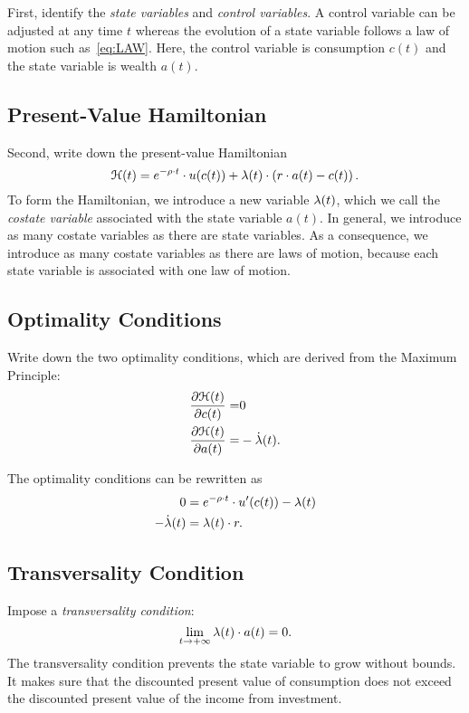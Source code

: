 \documentclass[letterpaper,12pt,leqno]{article}
\begin{document}
First, identify the \textit{state variables} and \textit{control variables}. A control variable can be adjusted at any time $t$ whereas the evolution of a state variable follows a law of motion such as~\eqref{eq:LAW}. Here, the control variable is consumption $c(t)$ and the state variable is wealth $a(t)$.

\subsection{Present-Value Hamiltonian}

Second, write down the present-value Hamiltonian
\begin{equation*}
\mathcal{H}(t) = e^{-\rho \cdot t}\cdot u(c(t)) +\lambda(t) \cdot \left( r\cdot a(t) - c(t) \right).
\end{equation*}
To form the Hamiltonian, we introduce a new variable $\lambda(t)$, which we call the \textit{costate variable} associated with the state variable $a(t)$. In general, we introduce as many costate variables as there are state variables. As a consequence, we introduce as many costate variables as there are laws of motion, because each state variable is associated with one law of motion.

\subsection{Optimality Conditions}  

Write down the two optimality conditions, which are derived from the Maximum Principle:
\begin{align}
\frac{\partial \mathcal{H}(t)}{\partial c(t)}=& 0 \label{eq:foc1}\\
\frac{\partial \mathcal{H}(t)}{\partial a(t)}=&-\dot{\lambda}(t)\label{eq:foc2}.
\end{align}

The optimality conditions can be rewritten as
\begin{align}
0 &= e^{-\rho \cdot t}\cdot u'(c(t)) -\lambda(t)\label{eq:focc} \\
-\dot{\lambda}(t)&= \lambda(t)\cdot  r  \label{eq:focs}.
\end{align}

\subsection{Transversality Condition} 

Impose a \textit{transversality condition}:
\begin{equation}
\lim_{t\to+\infty} \lambda(t)\cdot a(t)=0.\label{eq:trans1}
\end{equation}
The transversality condition prevents the state variable to grow without bounds. It makes sure that the discounted present value of consumption does not exceed the discounted present value of the income from investment.
\end{document}
